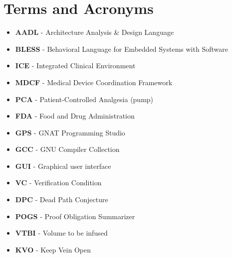 
\cleardoublepage

\chapter{Terms and Acronyms}
\label{Appendix:terms}

\begin{itemize}
  \item \textbf{AADL} - Architecture Analysis \& Design Language
  \item \textbf{BLESS} - Behavioral Language for Embedded Systems with Software
  \item \textbf{ICE} - Integrated Clinical Environment
  \item \textbf{MDCF} - Medical Device Coordination Framework
  \item \textbf{PCA} - Patient-Controlled Analgesia (pump)
  \item \textbf{FDA} - Food and Drug Administration
  \item \textbf{GPS} - GNAT Programming Studio
  \item \textbf{GCC} - GNU Compiler Collection  
  \item \textbf{GUI} - Graphical user interface
  \item \textbf{VC} - Verification Condition
  \item \textbf{DPC} - Dead Path Conjecture
  \item \textbf{POGS} - Proof Obligation Summarizer
  \item \textbf{VTBI} - Volume to be infused
  \item \textbf{KVO} - Keep Vein Open
\end{itemize}
